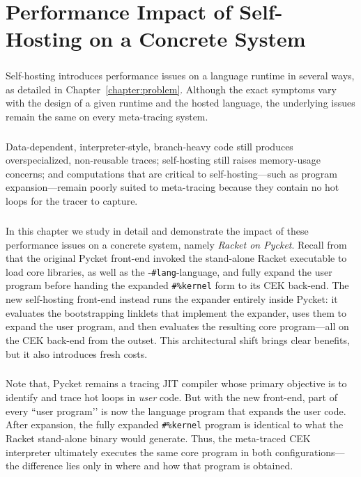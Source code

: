 \chapter{Performance Impact of Self-Hosting on a Concrete System}

	\label{chapter:analysis}

	\paragraph{}%
	 	Self-hosting introduces performance issues on a language runtime in several ways, as detailed in Chapter~\ref{chapter:problem}. Although the exact symptoms vary with the design of a given runtime and the hosted language, the underlying issues remain the same on every meta-tracing system.

	\paragraph{}%
	 	Data-dependent, interpreter-style, branch-heavy code still produces overspecialized, non-reusable traces; self-hosting still raises memory-usage concerns; and computations that are critical to self-hosting—such as program expansion—remain poorly suited to meta-tracing because they contain no hot loops for the tracer to capture.

	\paragraph{}%
	 	In this chapter we study in detail and demonstrate the impact of these performance issues on a concrete system, namely \emph{Racket on Pycket}. Recall from  that the original Pycket front-end invoked the stand-alone Racket executable to load core libraries, as well as the -\verb|#lang|-language, and fully expand the user program before handing the expanded \verb|#%kernel| form to its CEK back-end. The new self-hosting front-end instead runs the expander entirely inside Pycket: it evaluates the bootstrapping linklets that implement the expander, uses them to expand the user program, and then evaluates the resulting core program—all on the CEK back-end from the outset. This architectural shift brings clear benefits, but it also introduces fresh costs.

	\paragraph{}%
		Note that, Pycket remains a tracing JIT compiler whose primary objective is to identify and trace hot loops in \emph{user} code. But with the new front-end, part of every “user program’’ is now the language program that expands the user code. After expansion, the fully expanded \verb|#%kernel| program is identical to what the Racket stand-alone binary would generate. Thus, the meta-traced CEK interpreter ultimately executes the same core program in both configurations—the difference lies only in where and how that program is obtained.

